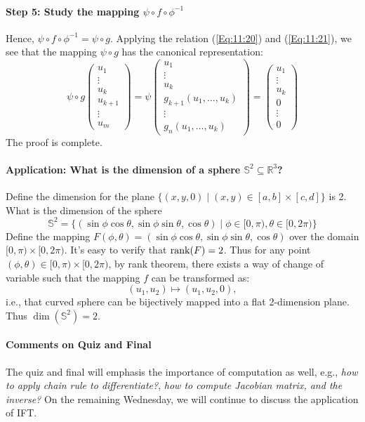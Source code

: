 \paragraph{Step 5: Study the mapping $\psi\circ f\circ\phi^{-1}$}
Hence, $\psi\circ f\circ\phi^{-1}=\psi\circ g$. Applying the relation (\ref{Eq:11:20}) and (\ref{Eq:11:21}), we see that the mapping $\psi\circ g$ has the canonical representation:
\[
\psi\circ g\begin{pmatrix}
u_1\\\vdots\\u_k\\u_{k+1}\\\vdots\\u_m
\end{pmatrix}=
\psi\begin{pmatrix}
u_1\\\vdots\\u_k\\g_{k+1}(u_1,\dots,u_k)\\\vdots\\g_n(u_1,\dots,u_k)
\end{pmatrix}=
\begin{pmatrix}
u_1\\\vdots\\u_k\\0\\\vdots\\0
\end{pmatrix}
\]
The proof is complete.

\paragraph{Application: What is the dimension of a sphere $\mathbb{S}^2\subseteq\mathbb{R}^3$?}
Define the dimension for the plane $\{(x,y,0)\mid (x,y)\in [a,b]\times[c,d]\}$ is 2. What is the dimension of the sphere 
\[\mathbb{S}^2=
\{(\sin\phi\cos\theta,\sin\phi\sin\theta,\cos\theta)\mid \phi\in[0,\pi),\theta\in[0,2\pi)\}
\]
Define the mapping $F(\phi,\theta)=(\sin\phi\cos\theta,\sin\phi\sin\theta,\cos\theta)$ over the domain $[0,\pi)\times[0,2\pi)$. It's easy to verify that $\operatorname{rank}(F)=2$. Thus for any point $(\phi,\theta)\in[0,\pi)\times[0,2\pi)$, by rank theorem, there exists a way of change of variable such that the mapping $f$ can be transformed as:
\[
(u_1,u_2)\mapsto(u_1,u_2,0),
\]
i.e., that curved sphere can be bijectively mapped into a flat 2-dimension plane. Thus $\dim(\mathbb{S}^2)=2$.


\paragraph{Comments on Quiz and Final}
The quiz and final will emphasis the importance of computation as well, e.g., \textit{how to apply chain rule to differentiate?}, \textit{how to compute Jacobian matrix, and the inverse?} On the remaining Wednesday, we will continue to discuss the application of IFT.
















